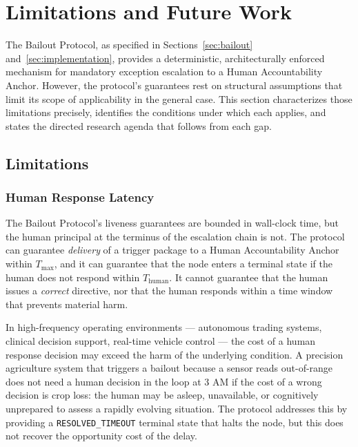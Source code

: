 \section{Limitations and Future Work}
\label{sec:limitations}

The Bailout Protocol, as specified in Sections~\ref{sec:bailout} and~\ref{sec:implementation}, provides a deterministic, architecturally enforced mechanism for mandatory exception escalation to a Human Accountability Anchor. However, the protocol's guarantees rest on structural assumptions that limit its scope of applicability in the general case. This section characterizes those limitations precisely, identifies the conditions under which each applies, and states the directed research agenda that follows from each gap.

\subsection{Limitations}
\label{sec:limitations-limitations}

\subsubsection{Human Response Latency}
\label{sec:limitations-latency}

The Bailout Protocol's liveness guarantees are bounded in wall-clock time, but the human principal at the terminus of the escalation chain is not. The protocol can guarantee \emph{delivery} of a trigger package to a Human Accountability Anchor within $T_{\max}$, and it can guarantee that the node enters a terminal state if the human does not respond within $T_{\text{human}}$. It cannot guarantee that the human issues a \emph{correct} directive, nor that the human responds within a time window that prevents material harm.

In high-frequency operating environments — autonomous trading systems, clinical decision support, real-time vehicle control — the cost of a human response decision may exceed the harm of the underlying condition. A precision agriculture system that triggers a bailout because a sensor reads out-of-range does not need a human decision in the loop at 3 AM if the cost of a wrong decision is crop loss: the human may be asleep, unavailable, or cognitively unprepared to assess a rapidly evolving situation. The protocol addresses this by providing a \texttt{RESOLVED\_{TIMEOUT}} terminal state that halts the node, but this does not recover the opportunity cost of the delay.

